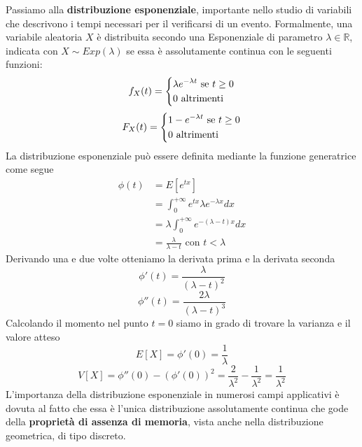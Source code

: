 \documentclass[a4paper,12pt, oneside]{book}
\newcommand{\numberset}{\mathbb}
\newcommand{\R}{\numberset{R}}
\begin{document}
Passiamo alla \textbf{distribuzione esponenziale}, importante nello studio di variabili che descrivono i tempi
necessari per il verificarsi di un evento.\newline
Formalmente, una variabile aleatoria $X$ è distribuita secondo una Esponenziale di parametro $\lambda \in \R$,
indicata con $X \sim Exp(\lambda)$ se essa è assolutamente continua con le seguenti funzioni:
\[f_X(t) = \begin{dcases}
            \lambda e^{-\lambda t} \mbox{ se } t \geq 0\\
            0 \mbox{ altrimenti}
            \end{dcases}\]
\[F_X(t) = \begin{dcases}
            1 - e^{-\lambda t} \mbox{ se } t \geq 0\\
            0 \mbox{ altrimenti}
            \end{dcases}\]
La distribuzione esponenziale può essere definita mediante la funzione generatrice come segue
\[ \begin{split}
    \phi(t) & = E[e^{tx}] \\
            & = \int _0 ^{+\infty} e^{tx} \lambda e^{-\lambda x} dx\\
            & = \lambda \int _0 ^{+\infty} e^{-(\lambda - t)x} dx\\
            & = \frac{\lambda}{\lambda - t} \mbox{ con $t < \lambda$}
    \end{split} \]
Derivando una e due volte otteniamo la derivata prima e la derivata seconda
\[ \phi'(t) = \frac{\lambda}{(\lambda - t)^2} \]
\[ \phi''(t) = \frac{2\lambda}{(\lambda - t)^3} \]
Calcolando il momento nel punto $t = 0$ siamo in grado di trovare la varianza e il valore atteso 
\[E[X] = \phi'(0) = \frac{1}{\lambda}\]
\[V[X] = \phi''(0) - (\phi'(0))^2 = \frac{2}{\lambda^2} - \frac{1}{\lambda^2} = \frac{1}{\lambda^2} \]
L'importanza della distribuzione esponenziale in numerosi campi applicativi è dovuta al fatto che essa è
l’unica distribuzione assolutamente continua che gode della \textbf{proprietà di assenza di memoria}, vista
anche nella distribuzione geometrica, di tipo discreto.
\end{document}
